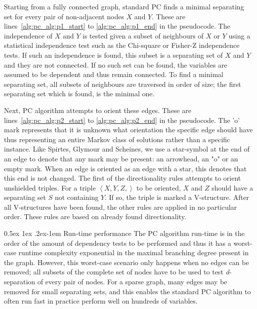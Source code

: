 \documentclass[a4paper, english]{article}
\makeatletter
\renewcommand{\paragraph}{%
  \@startsection{paragraph}{4}%
  {\z@}{0.5ex \@plus 1ex \@minus .2ex}{-1em}%
  {\normalfont\normalsize\bfseries}%
}
\makeatother
\begin{document}
Starting from a fully connected graph, standard PC finds a minimal separating set for every pair of non-adjacent nodes $X$ and $Y$.
These are lines~\ref{alg:pc_alg:p1_start} to \ref{alg:pc_alg:p1_end} in the pseudocode.
The independence of $X$ and $Y$ is tested given a subset of neighbours of $X$ or $Y$ using a statistical independence test such as the Chi-square or Fisher-Z independence tests.
If such an independence is found, this subset is a separating set of $X$ and $Y$ and they are not connected.
If no such set can be found, the variables are assumed to be dependent and thus remain connected.
To find a minimal separating set, all subsets of neighbours are traversed in order of size; the first separating set which is found, is the minimal one.

Next, PC algorithm attempts to orient these edges.
These are lines~\ref{alg:pc_alg:p2_start} to \ref{alg:pc_alg:p2_end} in the pseudocode.
The 'o' mark represents that it is unknown what orientation the specific edge should have thus representing an entire Markov class of solutions rather than a specific instance.
Like Spirtes, Glymour and Scheines, we use a star-symbol at the end of an edge to denote that any mark may be present: an arrowhead, an "o" or an empty mark.
When an edge is oriented as an edge with a star, this denotes that this end is not changed.
The first of the directionality rules attempts to orient unshielded triples.
For a triple $\left < X,Y,Z, \right>$ to be oriented, $X$ and $Z$ should have a separating set $S$ not containing $Y$.
If so, the triple is marked a V-structure.
After all V-structures have been found, the other rules are applied in no particular order.
These rules are based on already found directionality.

\paragraph{Run-time performance}
The PC algorithm run-time is in the order of the amount of dependency tests to be performed and thus it has a worst-case runtime complexity exponential in the maximal branching degree present in the graph.
However, this worst-case scenario only happens when no edges can be removed; all subsets of the complete set of nodes have to be used to test \textit{d}-separation of every pair of nodes.
For a sparse graph, many edges may be removed for small separating sets, and this enables the standard PC algorithm to often run fast in practice perform well on hundreds of variables.
\end{document}
